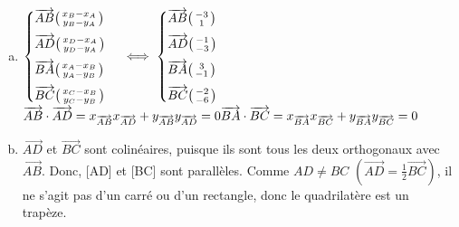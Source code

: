 \documentclass[12pt, a4paper]{article}
\begin{document}
\begin{Exercise}[number={72}]
    \begin{enumerate}[a)]
        \item $\begin{cases}\overrightarrow{AB}\begin{psmallmatrix}x_B-x_A\\y_B-y_A\end{psmallmatrix}\\[0.2cm] \overrightarrow{AD}\begin{psmallmatrix}x_D-x_A\\y_D-y_A\end{psmallmatrix} \\[0.2cm] \overrightarrow{BA}\begin{psmallmatrix}x_A-x_B\\y_A-y_B\end{psmallmatrix} \\[0.2cm] \overrightarrow{BC}\begin{psmallmatrix}x_C-x_B\\y_C-y_B\end{psmallmatrix}\end{cases} \iff \begin{cases}\overrightarrow{AB}\begin{psmallmatrix}-3\\1\end{psmallmatrix}\\[0.2cm] \overrightarrow{AD}\begin{psmallmatrix}-1\\-3\end{psmallmatrix} \\[0.2cm] \overrightarrow{BA}\begin{psmallmatrix}3\\-1\end{psmallmatrix} \\[0.2cm] \overrightarrow{BC}\begin{psmallmatrix}-2\\-6\end{psmallmatrix}\end{cases}$ \medbreak $\overrightarrow{AB}\cdot\overrightarrow{AD}=x_{\overrightarrow{AB}}x_{\overrightarrow{AD}}+y_{\overrightarrow{AB}}y_{\overrightarrow{AD}}=0 \\ \overrightarrow{BA}\cdot\overrightarrow{BC}=x_{\overrightarrow{BA}}x_{\overrightarrow{BC}}+y_{\overrightarrow{BA}}y_{\overrightarrow{BC}}=0$
        \item $\overrightarrow{AD}$ et $\overrightarrow{BC}$ sont colinéaires, puisque ils sont tous les deux orthogonaux avec $\overrightarrow{AB}$. Donc, [AD] et [BC] sont parallèles. Comme $AD\neq BC$ $(\overrightarrow{AD}=\frac{1}{2}\overrightarrow{BC})$, il ne s'agit pas d'un carré ou d'un rectangle, donc le quadrilatère est un trapèze.
    \end{enumerate}
\end{Exercise}
\end{document}
